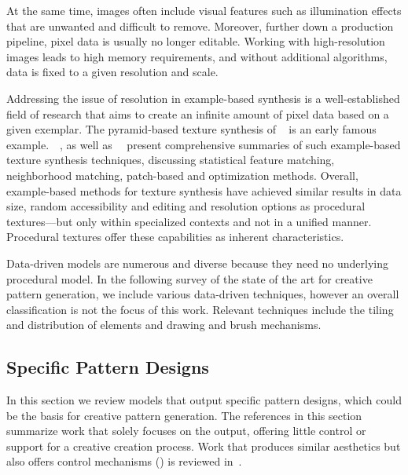At the same time, images often include visual features such as illumination effects that are unwanted and difficult to remove. Moreover, further down a production pipeline, pixel data is usually no longer editable. Working with high-resolution images leads to high memory requirements, and without additional algorithms, data is fixed to a given resolution and scale.

Addressing the issue of resolution in example-based synthesis is a well-established field of research that aims to create an infinite amount of pixel data based on a given exemplar. The pyramid-based texture synthesis of \citeauthor*{heeger_1995_pbt}~\cite{heeger_1995_pbt} is an early famous example.~\citeauthor*{wei_2009_seb}~\cite{wei_2009_seb}, as well as~\citeauthor*{barnes_2017_aso}~\cite{barnes_2017_aso} present comprehensive summaries of such example-based texture synthesis techniques, discussing statistical feature matching, neighborhood matching, patch-based and optimization methods. Overall, example-based methods for texture synthesis have achieved similar results in data size, random accessibility and editing and resolution options as procedural textures---but only within specialized contexts and not in a unified manner. Procedural textures offer these capabilities as inherent characteristics.

Data-driven models are numerous and diverse because they need no underlying procedural model. In the following survey of the state of the art for creative pattern generation, we include various data-driven techniques, however an overall classification is not the focus of this work. Relevant techniques include the tiling and distribution of elements and drawing and brush mechanisms.


\subsection{Specific Pattern Designs}
\label{subsec:specific_pattern_designs}

In this section we review models that output specific pattern designs, which could be the basis for creative pattern generation. The references in this section summarize work that solely focuses on the output, offering little control or support for a creative creation process. Work that produces similar aesthetics but also offers control mechanisms (\eg \cite{wong_1998_cgf,yu_2012_ans,zehnder_2016_dso}) is reviewed in~.



